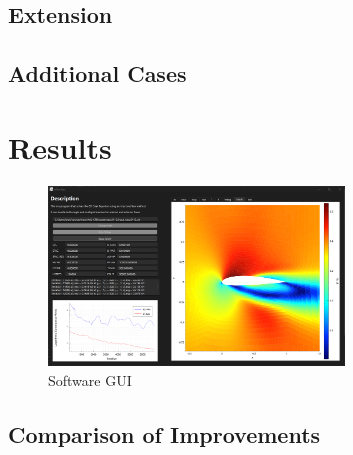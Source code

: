 \documentclass{article}
\begin{document}
\subsection{Extension}


\subsection{Additional Cases}


\section{Results}

\begin{figure}[H]
    \centering
    \includegraphics[width=0.7\textwidth]{figures/software.png}
    \caption{Software GUI}
    \label{fig:software}
\end{figure}

\subsection{Comparison of Improvements}
\end{document}
